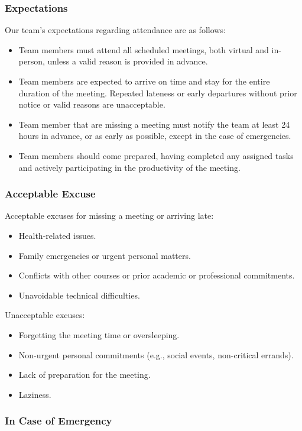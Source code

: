 \documentclass{article}
\begin{document}
\subsubsection*{Expectations}

Our team's expectations regarding attendance are as follows:
\begin{itemize}
    \item Team members must attend all scheduled meetings, both virtual and in-person, unless a valid reason is provided in advance.
    \item Team members are expected to arrive on time and stay for the entire duration of the meeting. Repeated lateness or early departures without prior notice or valid reasons are unacceptable.
    \item Team member that are missing a meeting must notify the team at least 24 hours in advance, or as early as possible, except in the case of emergencies.
    \item Team members should come prepared, having completed any assigned tasks and actively participating in the productivity of the meeting.
\end{itemize}

\subsubsection*{Acceptable Excuse}

Acceptable excuses for missing a meeting or arriving late:
\begin{itemize}
    \item Health-related issues.
    \item Family emergencies or urgent personal matters.
    \item Conflicts with other courses or prior academic or professional commitments.
    \item Unavoidable technical difficulties.
\end{itemize}
Unacceptable excuses:
\begin{itemize}
    \item Forgetting the meeting time or oversleeping.
    \item Non-urgent personal commitments (e.g., social events, non-critical errands).
    \item Lack of preparation for the meeting.
    \item Laziness.
\end{itemize}

\subsubsection*{In Case of Emergency}
\end{document}
